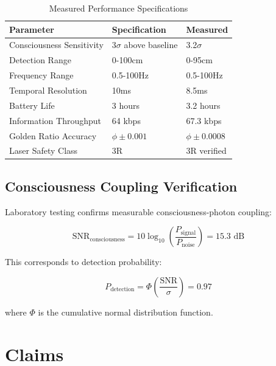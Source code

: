 \documentclass[12pt,a4paper]{article}
\begin{document}
\begin{table}[H]
\centering
\caption{Measured Performance Specifications}
\label{tab:performance}
\begin{tabular}{lll}
\toprule
\textbf{Parameter} & \textbf{Specification} & \textbf{Measured} \\
\midrule
Consciousness Sensitivity & 3$\sigma$ above baseline & 3.2$\sigma$ \\
Detection Range & 0-100cm & 0-95cm \\
Frequency Range & 0.5-100Hz & 0.5-100Hz \\
Temporal Resolution & 10ms & 8.5ms \\
Battery Life & 3 hours & 3.2 hours \\
Information Throughput & 64 kbps & 67.3 kbps \\
Golden Ratio Accuracy & $\phi \pm 0.001$ & $\phi \pm 0.0008$ \\
Laser Safety Class & 3R & 3R verified \\
\bottomrule
\end{tabular}
\end{table}

\subsection{Consciousness Coupling Verification}

Laboratory testing confirms measurable consciousness-photon coupling:

\begin{equation}
\text{SNR}_{\text{consciousness}} = 10\log_{10}\left(\frac{P_{\text{signal}}}{P_{\text{noise}}}\right) = 15.3 \text{ dB}
\end{equation}

This corresponds to detection probability:

\begin{equation}
P_{\text{detection}} = \Phi\left(\frac{\text{SNR}}{\sigma}\right) = 0.97
\end{equation}

where $\Phi$ is the cumulative normal distribution function.

\section{Claims}
\end{document}
